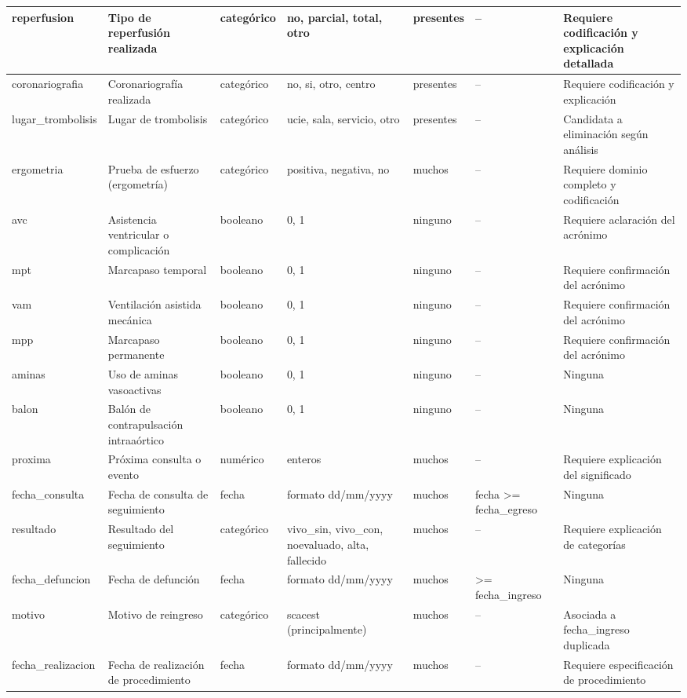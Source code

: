 \documentclass[11pt,a4paper]{article}
\begin{document}
\begin{longtable}{|L{0.095\textwidth}|L{0.17\textwidth}|L{0.07\textwidth}|L{0.16\textwidth}|L{0.14\textwidth}|L{0.13\textwidth}|L{0.15\textwidth}|}
reperfusion & Tipo de reperfusión realizada & categórico & no, parcial, total, otro & presentes & -- & Requiere codificación y explicación detallada \\ \hline
coronariografia & Coronariografía realizada & categórico & no, si, otro, centro & presentes & -- & Requiere codificación y explicación \\ \hline
lugar\_trombolisis & Lugar de trombolisis & categórico & ucie, sala, servicio, otro & presentes & -- & Candidata a eliminación según análisis \\ \hline
ergometria & Prueba de esfuerzo (ergometría) & categórico & positiva, negativa, no & muchos & -- & Requiere dominio completo y codificación \\ \hline
avc & Asistencia ventricular o complicación & booleano & 0, 1 & ninguno & -- & Requiere aclaración del acrónimo \\ \hline
mpt & Marcapaso temporal & booleano & 0, 1 & ninguno & -- & Requiere confirmación del acrónimo \\ \hline
vam & Ventilación asistida mecánica & booleano & 0, 1 & ninguno & -- & Requiere confirmación del acrónimo \\ \hline
mpp & Marcapaso permanente & booleano & 0, 1 & ninguno & -- & Requiere confirmación del acrónimo \\ \hline
aminas & Uso de aminas vasoactivas & booleano & 0, 1 & ninguno & -- & Ninguna \\ \hline
balon & Balón de contrapulsación intraaórtico & booleano & 0, 1 & ninguno & -- & Ninguna \\ \hline
proxima & Próxima consulta o evento & numérico & enteros & muchos & -- & Requiere explicación del significado \\ \hline
fecha\_consulta & Fecha de consulta de seguimiento & fecha & formato dd/mm/yyyy & muchos & fecha >= fecha\_egreso & Ninguna \\ \hline
resultado & Resultado del seguimiento & categórico & vivo\_sin, vivo\_con, noevaluado, alta, fallecido & muchos & -- & Requiere explicación de categorías \\ \hline
fecha\_defuncion & Fecha de defunción & fecha & formato dd/mm/yyyy & muchos & >= fecha\_ingreso & Ninguna \\ \hline
motivo & Motivo de reingreso & categórico & scacest (principalmente) & muchos & -- & Asociada a fecha\_ingreso duplicada \\ \hline
fecha\_realizacion & Fecha de realización de procedimiento & fecha & formato dd/mm/yyyy & muchos & -- & Requiere especificación de procedimiento \\ \hline

\end{longtable}
\end{document}
